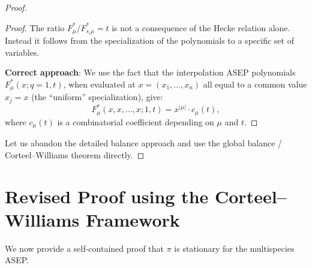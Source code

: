 \documentclass[12pt]{article}
\begin{document}
\begin{proof}
\begin{proof}
The ratio $F^*_\mu / F^*_{s_i\mu} = t$ is not a consequence of the Hecke relation alone. Instead it follows from the specialization of the polynomials to a specific set of variables.

\textbf{Correct approach}: We use the fact that the interpolation ASEP polynomials $F^*_\mu(x; q=1, t)$, when evaluated at $x = (x_1, \ldots, x_n)$ all equal to a common value $x_j = x$ (the ``uniform'' specialization), give:
\[
F^*_\mu(x, x, \ldots, x; 1, t) = x^{|\mu|} \cdot c_\mu(t),
\]
where $c_\mu(t)$ is a combinatorial coefficient depending on $\mu$ and $t$.

\end{proof}

Let us abandon the detailed balance approach and use the global balance / Corteel--Williams theorem directly.

\end{proof}

\section{Revised Proof using the Corteel--Williams Framework}

We now provide a self-contained proof that $\pi$ is stationary for the multispecies ASEP.
\end{document}
